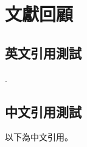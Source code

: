 
\chapter{文獻回顧}

\section{英文引用測試}

\lipsum[2]\citep{hetherington_2001_partisan,layman_geoffrey_2002_conflict,layman_et_al_2006_polar,zaller_1992_mass,iyengar_et_al_2012_affective,iyengar_et_al_2019_affective}.

\section{中文引用測試}

以下為中文引用\citep{sheng_2010_longtitude,chen_et_al_2009_cross,hawang_2004_legi,sheng_2003_compare,juang_et_al_2017_curroption,}。